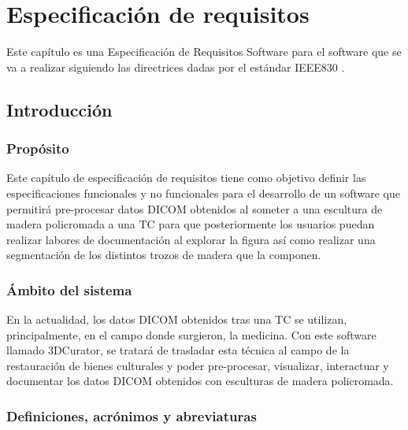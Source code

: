 \chapter{Especificación de requisitos}

Este capítulo es una Especificación de Requisitos Software para el software que se va a realizar siguiendo las directrices dadas por el estándar IEEE830 \cite{iee830}.

\section{Introducción}

\subsection{Propósito}

Este capítulo de especificación de requisitos tiene como objetivo definir las especificaciones funcionales y no funcionales para el desarrollo de un software que permitirá pre-procesar datos DICOM obtenidos al someter a una escultura de madera policromada a una TC para que posteriormente los usuarios puedan realizar labores de documentación al explorar la figura así como realizar una segmentación de los distintos trozos de madera que la componen. 

\subsection{Ámbito del sistema}

En la actualidad, los datos DICOM obtenidos tras una TC se utilizan, principalmente, en el campo donde surgieron, la medicina. Con este software llamado 3DCurator, se tratará de trasladar esta técnica al campo de la restauración de bienes culturales y poder pre-procesar, visualizar, interactuar y documentar los datos DICOM obtenidos con esculturas de madera policromada.

\subsection{Definiciones, acrónimos y abreviaturas}

